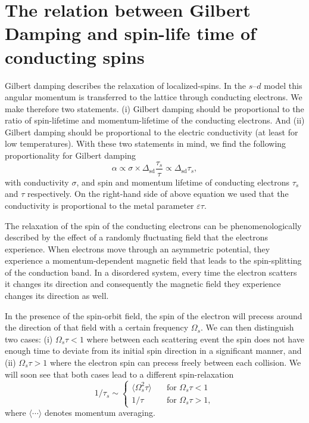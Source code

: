 \section[Gilbert Damping and spin-life time of conducting spins]{The relation between Gilbert Damping and spin-life time of conducting spins%
}
\label{intro:gilbert}
Gilbert damping describes the relaxation of localized-spins. In the $s$--$d$ model this angular momentum is transferred to the lattice through conducting electrons. We make therefore two statements. (i) Gilbert damping should be proportional to the ratio of spin-lifetime and momentum-lifetime of the conducting electrons. And (ii) Gilbert damping should be proportional to the electric conductivity (at least for low temperatures). With these two statements in mind, we find the following proportionality for Gilbert damping
\begin{equation}
	\alpha \propto \sigma \times \Delta_{\text{sd}} \frac{\tau_s}{\tau} \propto \Delta_{\text{sd}}\tau_s,
\end{equation}
with conductivity $\sigma$, and spin and momentum lifetime of conducting electrons $\tau_s$ and $\tau$ respectively. On the right-hand side of above equation we used that the conductivity is proportional to the metal parameter $\varepsilon\tau$.  

The relaxation of the spin of the conducting electrons can be phenomenologically described by the effect of a randomly fluctuating field that the electrons experience. When electrons move through an asymmetric potential, they experience a momentum-dependent magnetic field that leads to the spin-splitting of the conduction band. In a disordered system, every time the electron scatters it changes its direction and consequently the magnetic field they experience changes its direction as well. 

In the presence of the spin-orbit field, the spin of the electron will precess around the direction of that field with a certain frequency $\Omega_s$. We can then distinguish two cases: (i) $\Omega_s \tau < 1$ where between each scattering event the spin does not have enough time to deviate from its initial spin direction in a significant manner, and (ii) $\Omega_s\tau>1$ where the electron spin can precess freely between each collision. We will soon see that both cases lead to a different spin-relaxation
\begin{equation}
	1/\tau_s \sim \begin{cases}
    	\langle \Omega^2_s\tau\rangle & \quad\text{for  } \Omega_s\tau < 1\\
        1/\tau  &\quad \text{for  }  \Omega_s\tau>1,
    \end{cases}
\end{equation}
where $\langle\cdots\rangle$ denotes momentum averaging. 

